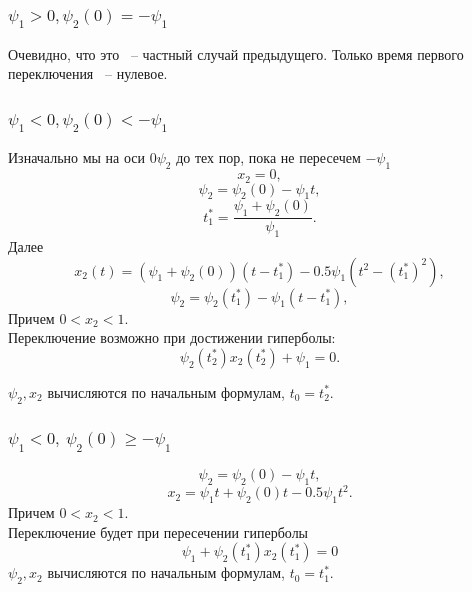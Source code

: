 \documentclass[12pt, fleqn]{article}
\begin{document}
\subsubsection{$\psi_1 > 0, \psi_2(0) = -\psi_1$}
Очевидно, что это ~-- частный случай предыдущего. Только время первого переключения ~-- нулевое.
\subsubsection{$\psi_1 < 0, \psi_2(0) < -\psi_1$}
Изначально мы на оси $0\psi_2$ до тех пор, пока не пересечем $-\psi_1$
\begin{equation}
x_2 = 0,
\end{equation}
\begin{equation}
\psi_2 = \psi_2(0) - \psi_1t,
\end{equation}
\begin{equation}
t_1^* = \frac{\psi_1 + \psi_2(0)}{\psi_1}.
\end{equation}
Далее
\begin{equation}
x_2(t) = (\psi_1 + \psi_2(0))(t - t_1^*) - 0.5\psi_1(t^2 - (t_1^*)^2),
\end{equation}
\begin{equation}
\psi_2 = \psi_2(t_1^*) - \psi_1(t - t_1^*),
\end{equation}
Причем $0<x_2<1$.\\
Переключение возможно при достижении гиперболы:
\begin{equation}
\psi_2(t_2^*)x_2(t_2^*) + \psi_1 = 0.
\end{equation}

$\psi_2, x_2$ вычисляются по начальным формулам, $t_0 = t_2^*$.

\subsubsection{$\psi_1 < 0, \ \psi_2(0) \geqslant -\psi_1$}
\begin{equation}
\psi_2 = \psi_2(0) - \psi_1t,
\end{equation}
\begin{equation}
x_2 = \psi_1t + \psi_2(0)t - 0.5\psi_1t^2.
\end{equation}
Причем $0<x_2<1$.\\
Переключение будет при пересечении гиперболы
$$
\psi_1 + \psi_2(t_1^*)x_2(t_1^*) = 0
$$
$\psi_2, x_2$ вычисляются по начальным формулам, $t_0 = t_1^*$.
\end{document}

